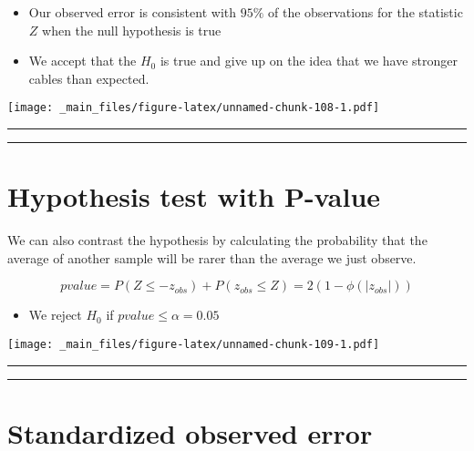 \documentclass[
]{book}
\providecommand{\tightlist}{%
  \setlength{\itemsep}{0pt}\setlength{\parskip}{0pt}}
\begin{document}
\begin{itemize}
\item
  Our observed error is consistent with \(95\%\) of the observations for the statistic \(Z\) when the null hypothesis is true
\item
  We accept that the \(H_0\) is true and give up on the idea that we have stronger cables than expected.
\end{itemize}

\texttt{[image: \_main\_files/figure-latex/unnamed-chunk-108-1.pdf]}

\begin{center}\rule{0.5\linewidth}{0.5pt}\end{center}

\begin{center}\rule{0.5\linewidth}{0.5pt}\end{center}

\hypertarget{hypothesis-test-with-p-value}{%
\section{Hypothesis test with P-value}\label{hypothesis-test-with-p-value}}

We can also contrast the hypothesis by calculating the probability that the average of another sample will be rarer than the average we just observe.

\[pvalue = P(Z \leq -z_{obs}) + P(z_{obs} \leq Z) = 2 (1-\phi(|z_{obs}|))\]

\begin{itemize}
\tightlist
\item
  We reject \(H_0\) if \(pvalue \leq \alpha =0.05\)
\end{itemize}

\texttt{[image: \_main\_files/figure-latex/unnamed-chunk-109-1.pdf]}

\begin{center}\rule{0.5\linewidth}{0.5pt}\end{center}

\begin{center}\rule{0.5\linewidth}{0.5pt}\end{center}

\hypertarget{standardized-observed-error-1}{%
\section{Standardized observed error}\label{standardized-observed-error-1}}
\end{document}
